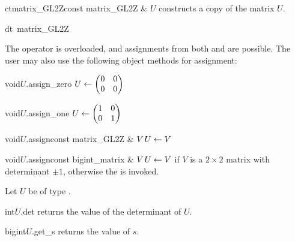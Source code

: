 \begin{fcode}{ct}{matrix_GL2Z}{const matrix_GL2Z & $U$}
  constructs a copy of the matrix $U$.
\end{fcode}

\begin{fcode}{dt}{~matrix_GL2Z}{}
\end{fcode}



\ASGN

The operator \code{=} is overloaded, and assignments from both  and
 are possible.  The user may also use the following object methods for
assignment:

\begin{fcode}{void}{$U$.assign_zero}{}
  $U \leftarrow \begin{pmatrix} 0 & 0 \\ 0 & 0 \end{pmatrix}$
\end{fcode}

\begin{fcode}{void}{$U$.assign_one}{}
  $U \leftarrow \begin{pmatrix} 1 & 0 \\ 0 & 1 \end{pmatrix}$
\end{fcode}

\begin{fcode}{void}{$U$.assign}{const matrix_GL2Z & $V$}
  $U \leftarrow V$
\end{fcode}

\begin{fcode}{void}{$U$.assign}{const bigint_matrix & $V$}
  $U \leftarrow V$ if $V$ is a $2 \times 2$ matrix with determinant $\pm 1$, otherwise the \LEH is
  invoked.
\end{fcode}



\ACCS

Let $U$ be of type .

\begin{cfcode}{int}{$U$.det}{}
  returns the value of the determinant of $U$.
\end{cfcode}

\begin{cfcode}{bigint}{$U$.get_s}{}
  returns the value of $s$.
\end{cfcode}

